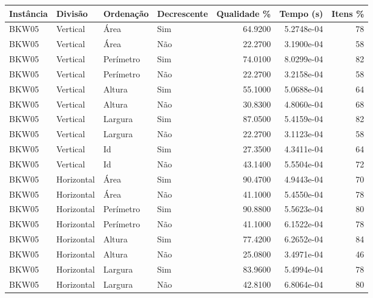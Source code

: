 \begin{tabular}{llllrrr}
    \hline
    Instância & Divisão     & Ordenação & Decrescente & Qualidade \% & Tempo (s)  & Itens \% \\
    \hline
    BKW05     & Vertical    & Área      & Sim         & 64.9200      & 5.2748e-04 & 78       \\
    BKW05     & Vertical    & Área      & Não         & 22.2700      & 3.1900e-04 & 58       \\
    BKW05     & Vertical    & Perímetro & Sim         & 74.0100      & 8.0299e-04 & 82       \\
    BKW05     & Vertical    & Perímetro & Não         & 22.2700      & 3.2158e-04 & 58       \\
    BKW05     & Vertical    & Altura    & Sim         & 55.1000      & 5.0688e-04 & 64       \\
    BKW05     & Vertical    & Altura    & Não         & 30.8300      & 4.8060e-04 & 68       \\
    BKW05     & Vertical    & Largura   & Sim         & 87.0500      & 5.4159e-04 & 82       \\
    BKW05     & Vertical    & Largura   & Não         & 22.2700      & 3.1123e-04 & 58       \\
    BKW05     & Vertical    & Id        & Sim         & 27.3500      & 4.3411e-04 & 64       \\
    BKW05     & Vertical    & Id        & Não         & 43.1400      & 5.5504e-04 & 72       \\
    BKW05     & Horizontal  & Área      & Sim         & 90.4700      & 4.9443e-04 & 70       \\
    BKW05     & Horizontal  & Área      & Não         & 41.1000      & 5.4550e-04 & 78       \\
    BKW05     & Horizontal  & Perímetro & Sim         & 90.8800      & 5.5623e-04 & 80       \\
    BKW05     & Horizontal  & Perímetro & Não         & 41.1000      & 6.1522e-04 & 78       \\
    BKW05     & Horizontal  & Altura    & Sim         & 77.4200      & 6.2652e-04 & 84       \\
    BKW05     & Horizontal  & Altura    & Não         & 25.0800      & 3.4971e-04 & 46       \\
    BKW05     & Horizontal  & Largura   & Sim         & 83.9600      & 5.4994e-04 & 78       \\
    BKW05     & Horizontal  & Largura   & Não         & 42.8100      & 6.8064e-04 & 80       \\

\end{tabular}
